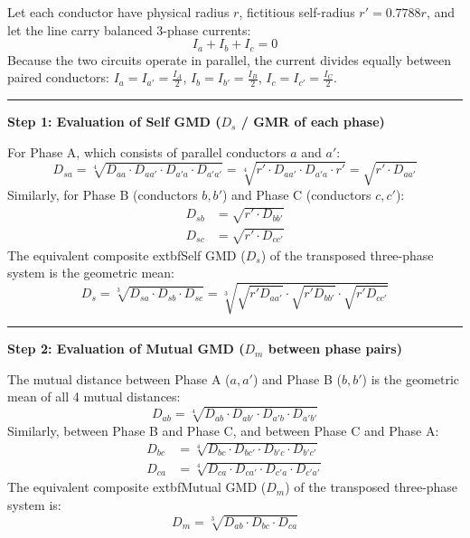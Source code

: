 \documentclass[11pt,a4paper]{article}
\newcommand{\concept}[1]{%
  \vspace{3pt}\noindent\textcolor{AnthGreen}{\rule{3.5pt}{10pt}}\enspace
  \textbf{\sffamily\color{AnthDark}#1}\par\vspace{2pt}%
}
\newenvironment{Deriv}[1][Mathematical Derivation]{\begin{tcolorbox}[derivbox, title=#1]}{\end{tcolorbox}}
\begin{document}
\begin{Deriv}[Complete Step-by-Step Derivation of Inductance for 3-$\Phi$ Double Circuit]
Let each conductor have physical radius $r$, fictitious self-radius $r' = 0.7788r$, and let the line carry balanced 3-phase currents:
\begin{equation}
  I_a + I_b + I_c = 0
\end{equation}
Because the two circuits operate in parallel, the current divides equally between paired conductors:
$I_a = I_{a'} = \frac{I_A}{2}$, $I_b = I_{b'} = \frac{I_B}{2}$, $I_c = I_{c'} = \frac{I_C}{2}$.

\concept{Step 1: Evaluation of Self GMD ($D_s$ / GMR of each phase)}
For Phase A, which consists of parallel conductors $a$ and $a'$:
\begin{equation}
  D_{sa} = \sqrt[4]{D_{aa} \cdot D_{aa'} \cdot D_{a'a} \cdot D_{a'a'}} = \sqrt[4]{r' \cdot D_{aa'} \cdot D_{a'a} \cdot r'} = \sqrt{r' \cdot D_{aa'}}
\end{equation}
Similarly, for Phase B (conductors $b, b'$) and Phase C (conductors $c, c'$):
\begin{align}
  D_{sb} &= \sqrt{r' \cdot D_{bb'}} \\
  D_{sc} &= \sqrt{r' \cdot D_{cc'}}
\end{align}
The equivalent composite 	extbf{Self GMD ($D_s$)} of the transposed three-phase system is the geometric mean:
\begin{equation}
  D_s = \sqrt[3]{D_{sa} \cdot D_{sb} \cdot D_{sc}} = \sqrt[3]{\sqrt{r' D_{aa'}} \cdot \sqrt{r' D_{bb'}} \cdot \sqrt{r' D_{cc'}}}
\end{equation}

\concept{Step 2: Evaluation of Mutual GMD ($D_m$ between phase pairs)}
The mutual distance between Phase A ($a, a'$) and Phase B ($b, b'$) is the geometric mean of all 4 mutual distances:
\begin{equation}
  D_{ab} = \sqrt[4]{D_{ab} \cdot D_{ab'} \cdot D_{a'b} \cdot D_{a'b'}}
\end{equation}
Similarly, between Phase B and Phase C, and between Phase C and Phase A:
\begin{align}
  D_{bc} &= \sqrt[4]{D_{bc} \cdot D_{bc'} \cdot D_{b'c} \cdot D_{b'c'}} \\
  D_{ca} &= \sqrt[4]{D_{ca} \cdot D_{ca'} \cdot D_{c'a} \cdot D_{c'a'}}
\end{align}
The equivalent composite 	extbf{Mutual GMD ($D_m$)} of the transposed three-phase system is:
\begin{equation}
  D_m = \sqrt[3]{D_{ab} \cdot D_{bc} \cdot D_{ca}}
\end{equation}


\end{Deriv}
\end{document}
